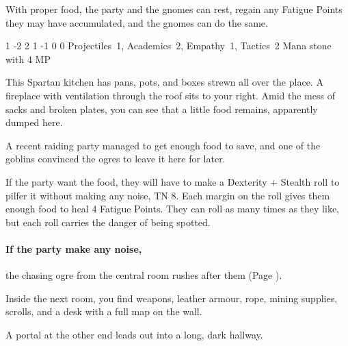 \begin{multicols}{2}
With proper food, the party and the gnomes can rest, regain any Fatigue Points they may have accumulated, and the gnomes can do the same.




{1}%
{-2}%
{{2}%
{1}%
{-1}}%
{0}%
{0}%
{Projectiles~1, Academics~2, Empathy~1, Tactics~2
}%
{Mana stone with 4 MP}%
{\addtocounter{sp}{8}}


\begin{boxtext}

	This Spartan kitchen has pans, pots, and boxes strewn all over the place.
	A fireplace with ventilation through the roof sits to your right.
	Amid the mess of sacks and broken plates, you can see that a little food remains, apparently dumped here.

\end{boxtext}

A recent raiding party managed to get enough food to save, and one of the goblins convinced the ogres to leave it here for later.

If the party want the food, they will have to make a Dexterity + Stealth roll to pilfer it without making any noise, TN 8.
Each margin on the roll gives them enough food to heal 4 Fatigue Points.
They can roll as many times as they like, but each roll carries the danger of being spotted.

\paragraph{If the party make any noise,}
the chasing ogre from the central room rushes after them (Page \pageref{chasingogre}).


\begin{boxtext}

	Inside the next room, you find weapons, leather armour, rope, mining supplies, scrolls, and a desk with a full map on the wall.

	A portal at the other end leads out into a long, dark hallway.


\end{boxtext}
\end{multicols}
